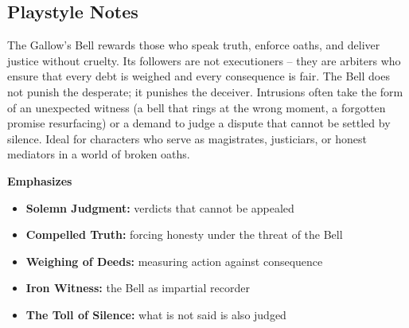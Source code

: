 \subsection*{Playstyle Notes}
The Gallow's Bell rewards those who speak truth, enforce oaths, and deliver justice without cruelty. Its followers are not executioners -- they are arbiters who ensure that every debt is weighed and every consequence is fair. The Bell does not punish the desperate; it punishes the deceiver. Intrusions often take the form of an unexpected witness (a bell that rings at the wrong moment, a forgotten promise resurfacing) or a demand to judge a dispute that cannot be settled by silence. Ideal for characters who serve as magistrates, justiciars, or honest mediators in a world of broken oaths.

\noindent\textbf{Emphasizes}
\begin{itemize}
  \item \textbf{Solemn Judgment:} verdicts that cannot be appealed
  \item \textbf{Compelled Truth:} forcing honesty under the threat of the Bell
  \item \textbf{Weighing of Deeds:} measuring action against consequence
  \item \textbf{Iron Witness:} the Bell as impartial recorder
  \item \textbf{The Toll of Silence:} what is not said is also judged
\end{itemize}